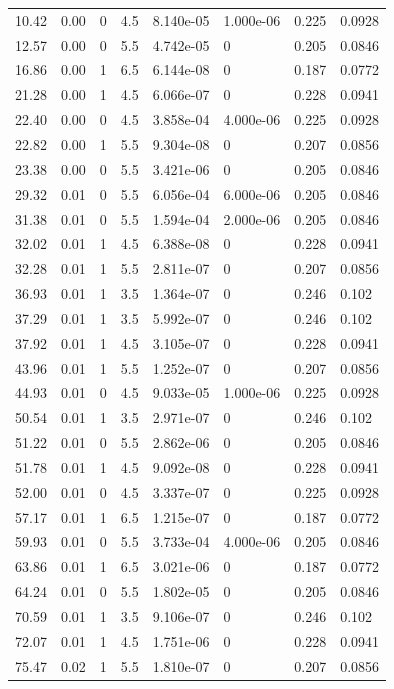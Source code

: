 \documentclass[preview]{standalone}
\begin{document}
{{\begin{tabular}{L{1.2cm}C{1.2cm} C{0.3cm}C{0.5cm} C{1.4cm}C{1.4cm} C{1.4cm}C{1.4cm}}
  10.42  &  0.00  & 0     & 4.5 &  8.140e-05  & 1.000e-06  & 0.225 &  0.0928   \\ 
  12.57  &  0.00  & 0     & 5.5 &  4.742e-05  & 0  & 0.205 &  0.0846   \\ 
  16.86  &  0.00  & 1     & 6.5 &  6.144e-08  & 0  & 0.187 &  0.0772   \\ 
  21.28  &  0.00  & 1     & 4.5 &  6.066e-07  & 0  & 0.228 &  0.0941   \\ 
  22.40  &  0.00  & 0     & 4.5 &  3.858e-04  & 4.000e-06  & 0.225 &  0.0928   \\ 
  22.82  &  0.00  & 1     & 5.5 &  9.304e-08  & 0  & 0.207 &  0.0856   \\ 
  23.38  &  0.00  & 0     & 5.5 &  3.421e-06  & 0  & 0.205 &  0.0846   \\ 
  29.32  &  0.01  & 0     & 5.5 &  6.056e-04  & 6.000e-06  & 0.205 &  0.0846   \\ 
  31.38  &  0.01  & 0     & 5.5 &  1.594e-04  & 2.000e-06  & 0.205 &  0.0846   \\ 
  32.02  &  0.01  & 1     & 4.5 &  6.388e-08  & 0  & 0.228 &  0.0941   \\ 
  32.28  &  0.01  & 1     & 5.5 &  2.811e-07  & 0  & 0.207 &  0.0856   \\ 
  36.93  &  0.01  & 1     & 3.5 &  1.364e-07  & 0  & 0.246 &  0.102   \\ 
  37.29  &  0.01  & 1     & 3.5 &  5.992e-07  & 0  & 0.246 &  0.102   \\ 
  37.92  &  0.01  & 1     & 4.5 &  3.105e-07  & 0  & 0.228 &  0.0941   \\ 
  43.96  &  0.01  & 1     & 5.5 &  1.252e-07  & 0  & 0.207 &  0.0856   \\ 
  44.93  &  0.01  & 0     & 4.5 &  9.033e-05  & 1.000e-06  & 0.225 &  0.0928   \\ 
  50.54  &  0.01  & 1     & 3.5 &  2.971e-07  & 0  & 0.246 &  0.102   \\ 
  51.22  &  0.01  & 0     & 5.5 &  2.862e-06  & 0  & 0.205 &  0.0846   \\ 
  51.78  &  0.01  & 1     & 4.5 &  9.092e-08  & 0  & 0.228 &  0.0941   \\ 
  52.00  &  0.01  & 0     & 4.5 &  3.337e-07  & 0  & 0.225 &  0.0928   \\ 
  57.17  &  0.01  & 1     & 6.5 &  1.215e-07  & 0  & 0.187 &  0.0772   \\ 
  59.93  &  0.01  & 0     & 5.5 &  3.733e-04  & 4.000e-06  & 0.205 &  0.0846   \\ 
  63.86  &  0.01  & 1     & 6.5 &  3.021e-06  & 0  & 0.187 &  0.0772   \\ 
  64.24  &  0.01  & 0     & 5.5 &  1.802e-05  & 0  & 0.205 &  0.0846   \\ 
  70.59  &  0.01  & 1     & 3.5 &  9.106e-07  & 0  & 0.246 &  0.102   \\ 
  72.07  &  0.01  & 1     & 4.5 &  1.751e-06  & 0  & 0.228 &  0.0941   \\ 
  75.47  &  0.02  & 1     & 5.5 &  1.810e-07  & 0  & 0.207 &  0.0856   \\ 
\hline 
\end{tabular} 

}}
\end{document}
